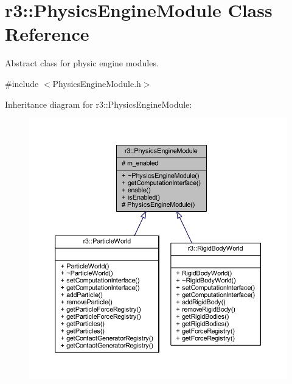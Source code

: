 \hypertarget{classr3_1_1_physics_engine_module}{}\section{r3\+:\+:Physics\+Engine\+Module Class Reference}
\label{classr3_1_1_physics_engine_module}


Abstract class for physic engine modules.  




{\ttfamily \#include $<$Physics\+Engine\+Module.\+h$>$}



Inheritance diagram for r3\+:\+:Physics\+Engine\+Module\+:\nopagebreak
\begin{figure}[H]
\begin{center}
\leavevmode
\includegraphics[width=350pt]{classr3_1_1_physics_engine_module__inherit__graph}
\end{center}
\end{figure}


